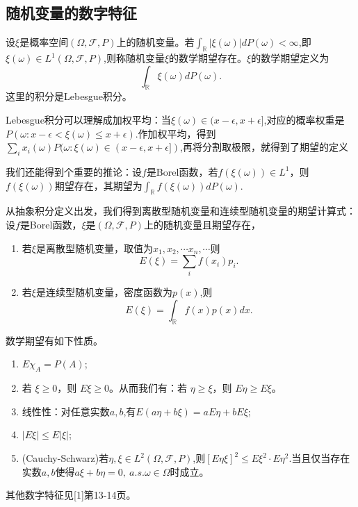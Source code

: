 \documentclass[lang=cn,10pt]{elegantbook}
\begin{document}
	\subsection{随机变量的数字特征}
	\begin{definition}[数学期望]
		设\(\xi\)是概率空间\((\Omega,\mathcal{F},P)\)上的随机变量。若\(\int_\mathbb{R}|\xi(\omega)|dP(\omega)<\infty\),即\(\xi(\omega)\in L^1(\Omega,\mathcal{F},P)\),则称随机变量\(\xi\)的数学期望存在。\(\xi\)的数学期望定义为
		\[\int_\mathbb{R}\xi(\omega)dP(\omega).\]
		这里的积分是Lebesgue积分。
	\end{definition}
	\begin{note}
		Lebesgue积分可以理解成加权平均：当\(\xi(\omega)\in (x-\epsilon,x+\epsilon]\),对应的概率权重是\(P(\omega:x-\epsilon<\xi(\omega)\le x+\epsilon)\).作加权平均，得到\(\sum_ix_i(\omega)P(\omega:\xi(\omega)\in (x-\epsilon,x+\epsilon])\),再将分割取极限，就得到了期望的定义
		
		我们还能得到个重要的推论：设\(f\)是Borel函数，若\(f(\xi(\omega))\in L^1\)，则\(f(\xi(\omega))\)期望存在，其期望为\(\int_\mathbb{R}f(\xi(\omega))dP(\omega).\)
	\end{note}
	从抽象积分定义出发，我们得到离散型随机变量和连续型随机变量的期望计算式：设\(f\)是Borel函数，\(\xi\)是\((\Omega,\mathcal{F},P)\)上的随机变量且期望存在，
	\begin{enumerate}
		\item 若\(\xi\)是离散型随机变量，取值为\(x_1,x_2,\cdots x_n,\cdots\)则
		\[E(\xi)=\sum_if(x_i)p_i.\]
		\item 若\(\xi\)是连续型随机变量，密度函数为\(p(x)\),则
		\[E(\xi)=\int_\mathbb{R}f(x)p(x)dx.\]
	\end{enumerate}
	数学期望有如下性质。
	\begin{property}
		\begin{enumerate}
			\item \(E\chi_{A}=P(A)\);
			\item 若 \(\xi \ge 0\)，则 \(E\xi \ge 0\)。从而我们有：若 \(\eta \ge \xi\)，则 \(E\eta \ge E\xi\)。
			\item 线性性：对任意实数\(a,b\),有\(E(a\eta +b\xi)=aE\eta+bE\xi\);
			\item \(|E\xi|\le E|\xi|\);
			\item (Cauchy-Schwarz)若\(\eta,\xi\in L^2(\Omega,\mathcal{F},P)\),则\([E\eta\xi]^2\le E\xi^2\cdot E\eta^2.\)当且仅当存在实数\(a,b\)使得\(a\xi+b\eta=0, \ a.s. \omega\in \Omega\)时成立。
		\end{enumerate}
	\end{property}
	其他数字特征见[1]第13-14页。
\end{document}
